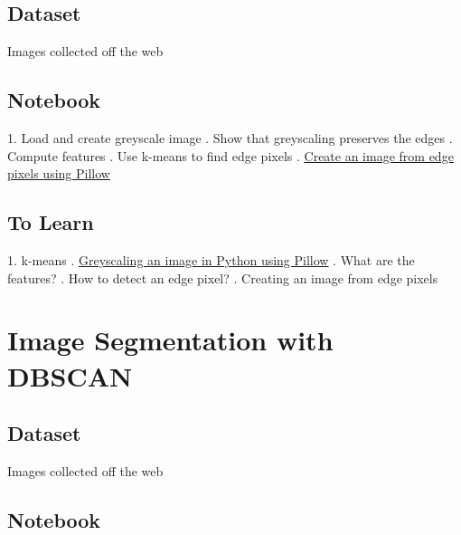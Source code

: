 \documentclass{article}
\begin{document}
\subsection*{Dataset} Images collected off the web

\subsection*{Notebook}
1. Load and create greyscale image
. Show that greyscaling preserves the edges
. Compute features
. Use k-means to find edge pixels
. \href{https://stackoverflow.com/questions/434583/what-is-the-fastest-way-to-draw-an-image-from-discrete-pixel-values-in-python}{Create an image from edge pixels using Pillow}
\subsection*{To Learn}
1. k-means
. \href{https://stackoverflow.com/questions/12201577/how-can-i-convert-an-rgb-image-into-grayscale-in-python}{Greyscaling an image in Python using Pillow}
. What are the features?
. How to detect an edge pixel?
. Creating an image from edge pixels
\section*{Image Segmentation with DBSCAN}
\subsection*{Dataset}
Images collected off the web
\subsection*{Notebook}
\end{document}
